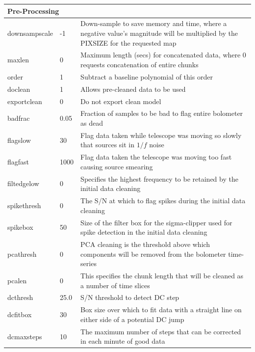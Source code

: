 \documentclass[twoside,11pt]{article}
\renewcommand{\_}{\texttt{\symbol{95}}}
\begin{document}
\begin{htmlonly}
\begin{table}
\begin{center}
\begin{small}
\begin{tabular}{|p{2.2cm}|p{1.1cm}|p{11.4cm}|}
\hline
\multicolumn{3}{|l|}{\textbf{Pre-Processing}}\\
\hline
downsampscale &   -1 & Down-sample to save memory and time, where a negative
                       value's magnitude will be multiplied by the PIXSIZE
                       for the requested map \\
maxlen        &    0 & Maximum length (secs) for concatenated data, where 0
                       requests concatenation of entire chunks \\
order         &    1 & Subtract a baseline polynomial of this order \\
doclean       &    1 & Allows pre-cleaned data to be used \\
exportclean   &    0 & Do not export clean model \\
badfrac       & 0.05 & Fraction of samples to be bad to flag entire bolometer
                       as dead \\
flagslow      &   30 & Flag data taken while telescope was moving so slowly
                       that sources sit in $1/f$ noise \\
flagfast      & 1000 & Flag data taken the telescope was moving too fast causing
                       source smearing \\
filt\_edgelow &    0 & Specifies the highest frequency to be retained by the
                       initial data cleaning \\
spikethresh   &    0 & The S/N at which to flag spikes during the initial
                       data cleaning \\
spikebox      &   50 & Size of the filter box for the sigma-clipper used
                       for spike detection in the initial data cleaning \\
pcathresh     &    0 & PCA cleaning is the threshold above which components
                       will be removed from the bolometer time-series \\
pcalen        &    0 & This specifies the chunk length that will be cleaned
                       as a number of time slices \\
dcthresh      & 25.0 & S/N threshold to detect DC step \\
dcfitbox      &   30 & Box size over which to fit data with a straight
                       line on either side of a potential DC jump \\
dcmaxsteps    &   10 & The maximum number of steps that can be corrected
                       in each minute of good data \\

\end{tabular}
\end{small}
\end{center}
\end{table}
\end{htmlonly}
\end{document}
